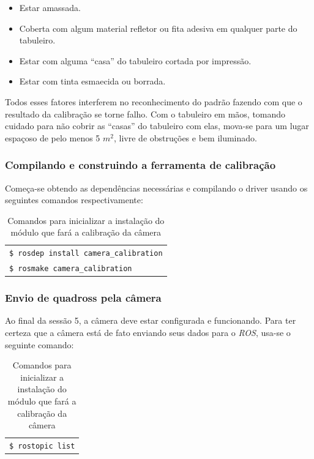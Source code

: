\begin{itemize}
	\item{Estar amassada.}
	\item{Coberta com algum material refletor ou fita adesiva em qualquer parte do tabuleiro.}
	\item{Estar com alguma “casa” do tabuleiro cortada por impressão.}
	\item{Estar com tinta esmaecida ou borrada.}
\end{itemize}	

Todos esses fatores interferem no reconhecimento do padrão fazendo com que o resultado da calibração se torne falho. Com o tabuleiro em mãos, tomando cuidado para não cobrir as “casas” do tabuleiro com elas, mova-se para um lugar espaçoso de pelo menos 5 $m^2$, livre de obstruções e bem iluminado.

\subsubsection{Compilando e construindo a ferramenta de calibração}

Começa-se obtendo as dependências necessárias e compilando o driver usando os seguintes comandos respectivamente:

\begin{table}[!ht]
\begin{tabular}{| p{\textwidth}|}
\hline
\texttt{\$ rosdep install camera\_calibration} \\
\texttt{\$ rosmake camera\_calibration} \\ \hline
\end{tabular}
\caption{Comandos para inicializar a instalação do módulo que fará a calibração da câmera}
\end{table}


\subsubsection{Envio de quadross pela câmera}

Ao final da sessão 5, a câmera deve estar configurada e funcionando. Para ter certeza que a câmera está de fato enviando seus dados para o \textit{ROS}, usa-se o seguinte comando:

\begin{table}[!ht]
\begin{tabular}{| p{\textwidth}|}
\hline
\texttt{\$ rostopic list}
\hline
\end{tabular}
\caption{Comandos para inicializar a instalação do módulo que fará a calibração da câmera}
\end{table}

